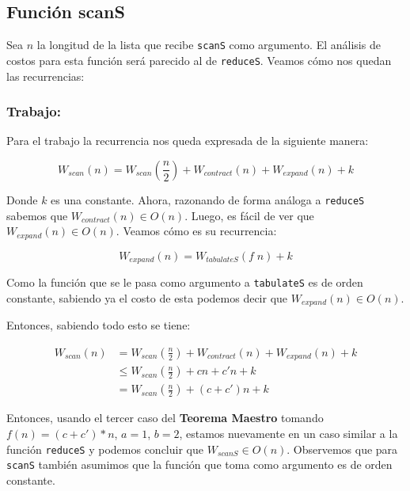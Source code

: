 \documentclass[11pt]{article}
\begin{document}
\subsection{Función scanS}

Sea $n$ la longitud de la lista que recibe \texttt{scanS} como argumento. El
análisis de costos para esta función será parecido al de \texttt{reduceS}. Veamos
cómo nos quedan las recurrencias:

\subsubsection{Trabajo:}

Para el trabajo la recurrencia nos queda expresada de la siguiente manera:

\begin{equation*}
    W_{scan}(n) = W_{scan}(\frac{n}{2}) + W_{contract}(n) + W_{expand}(n) + k
\end{equation*}

Donde $k$ es una constante. Ahora, razonando de forma análoga a \texttt{reduceS} sabemos 
que \newline $W_{contract}(n) \in O(n)$. Luego, es fácil de ver que $W_{expand}(n) \in O(n)$. 
Veamos cómo es su recurrencia:

\begin{equation*}
    W_{expand}(n) = W_{tabulateS}(f \; n) + k 
\end{equation*}

Como la función que se le pasa como argumento a \texttt{tabulateS} es de orden
constante, sabiendo ya el costo de esta podemos decir que
$W_{expand}(n) \in O(n)$.

Entonces, sabiendo todo esto se tiene:

\begin{align*}
    W_{scan}(n) & = W_{scan}(\frac{n}{2}) + W_{contract}(n) + W_{expand}(n) + k \\
                & \leq W_{scan}(\frac{n}{2}) + cn + c'n + k \\
                & = W_{scan}(\frac{n}{2}) + (c + c')n + k 
\end{align*}

Entonces, usando el tercer caso del \textbf{Teorema Maestro} tomando $f(n) = (c+c')*n$, $a = 1$, $b = 2$, 
estamos nuevamente en un caso similar a la función \texttt{reduceS} y podemos
concluir que $W_{scanS} \in O(n)$. Observemos que para \texttt{scanS} también
asumimos que la función que toma como argumento es de orden constante. 
\end{document}
